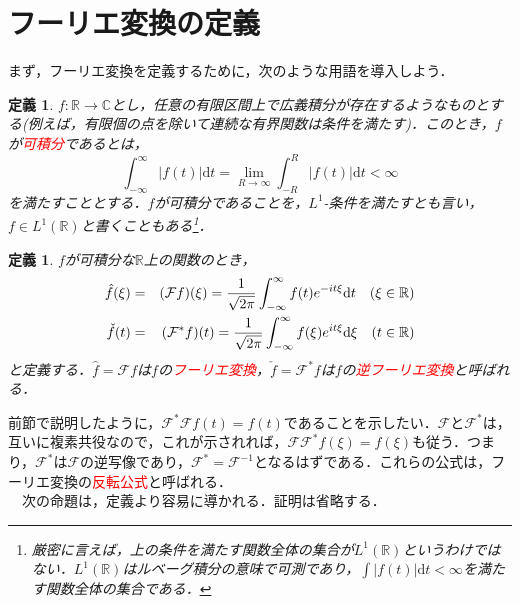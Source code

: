 \documentclass[a4j]{jsbook}
\newtheorem{definition}[theorem]{定義}
\numberwithin{theorem}{chapter}  %
\begin{document}
\section{フーリエ変換の定義} \label{sec3-2}
まず，フーリエ変換を定義するために，次のような用語を導入しよう．
\begin{definition}
\label{def3-1}
\(f:\mathbb{R}\to\mathbb{C}\)とし，任意の有限区間上で広義積分が存在するようなものとする(例えば，有限個の点を除いて連続な有界関数は条件を満たす)．このとき，\(f\)が\textcolor{red}{可積分}であるとは，
\begin{equation*}
    \int_{-\infty}^\infty |f(t)|\mathrm{d}t=\lim_{R\to\infty}\int_{-R}^R |f(t)|\mathrm{d}t<\infty
\end{equation*}
を満たすこととする．\(f\)が可積分であることを，\(L^1\)-条件を満たすとも言い，\(f\in L^1(\mathbb{R})\)と書くこともある\footnote{厳密に言えば，上の条件を満たす関数全体の集合が\(L^1(\mathbb{R})\)というわけではない．\(L^1(\mathbb{R})\)はルベーグ積分の意味で可測であり，\(\displaystyle\int|f(t)|\mathrm{d}t<\infty\)を満たす関数全体の集合である．}．
\end{definition}
\begin{definition}
\label{def3-2}
\(f\)が可積分な\(\mathbb{R}\)上の関数のとき，
\begin{eqnarray*}
\Hat{f}(\xi)&=&(\mathcal{F}f)(\xi)=\frac{1}{\sqrt{2\pi}}\int_{-\infty}^\infty f(t)e^{-it\xi}\mathrm{d}t\quad (\xi\in\mathbb{R}) \\
\check{f}(t)&=&(\mathcal{F}^* f)(t)=\frac{1}{\sqrt{2\pi}}\int_{-\infty}^\infty f(\xi)e^{it\xi}\mathrm{d}\xi\quad (t\in\mathbb{R})
\end{eqnarray*}
と定義する．\(\hat{f}=\mathcal{F}f\)は\(f\)の\textcolor{red}{フーリエ変換}，\(\check{f}=\mathcal{F}^* f\)は\(f\)の\textcolor{red}{逆フーリエ変換}と呼ばれる．
\end{definition}
前節で説明したように，\(\mathcal{F}^*\mathcal{F}f(t)=f(t)\)であることを示したい．\(\mathcal{F}\)と\(\mathcal{F}^*\)は，互いに複素共役なので，これが示されれば，\(\mathcal{F}\mathcal{F}^* f(\xi)=f(\xi)\)も従う．つまり，\(\mathcal{F}^*\)は\(\mathcal{F}\)の逆写像であり，\(\mathcal{F}^*=\mathcal{F}^{-1}\)となるはずである．これらの公式は，フーリエ変換の\textcolor{red}{反転公式}と呼ばれる．\\
　次の命題は，定義より容易に導かれる．証明は省略する．
\end{document}
